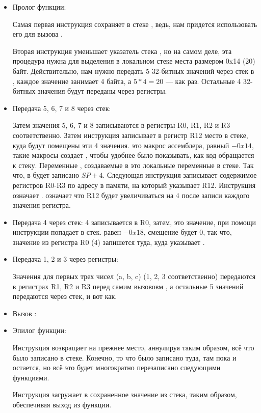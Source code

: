 \begin{itemize}
\item Пролог функции:

Самая первая инструкция  сохраняет в стеке \LR, ведь, 
нам придется использовать его для вызова \printf.

Вторая инструкция  уменьшает указатель стека \SP, но на самом деле, эта процедура нужна для выделения в локальном стеке места размером 0x14 (20) байт. Действительно, нам нужно передать 5 32-битных значений через стек в \printf, каждое значение занимает 4 байта, а $5*4=20$ --- как раз. Остальные 4 32-битных значения будут переданы через регистры.

\item Передача 5, 6, 7 и 8 через стек:

Затем значения 5, 6, 7 и 8 записываются в регистры R0, R1, R2 и R3 соответственно. Затем инструкция  записывает в регистр R12 место в стеке, куда будут помещены эти 4 значения. 
 это макрос ассемблера, равный $-0x14$, такие макросы создает \IDA, чтобы удобнее было показывать, как код обращается к стеку. Переменные , создаваемые в \IDA это локальные переменные в стеке. 
Так что, в  будет записано $SP+4$. 
Следующая инструкция  записывает содержимое регистров R0-R3 по адресу в памяти, на который указывает R12. 
Инструкция  означает . 
 означает что R12 будет увеличиваться на 4 после записи каждого значения регистра.

\item Передача 4 через стек:
4 записывается в R0, затем, это значение, при помощи инструкции  попадает
в стек.  равен $-0x18$, смещение будет 0, так что, значение из регистра R0 (4) запишется туда, куда
указывает \SP.

\item Передача 1, 2 и 3 через регистры:

Значения для первых трех чисел (a, b, c) (1, 2, 3 соответственно) передаются в регистрах R1, R2 и R3 перед самим
вызововм \printf, а остальные 5 значений передаются через стек, и вот как.

\item Вызов \printf:

\item Эпилог функции:

Инструкция  возвращает \SP на прежнее место, аннулируя таким образом, всё что было
записано в стеке. Конечно, то что было записано туда, там пока и остается, но всё это будет многократно 
перезаписано следующими функциями.

Инструкция  загружает в \PC сохраненное значение \LR из стека, таким образом,
обеспечивая выход из функции.

\end{itemize}

